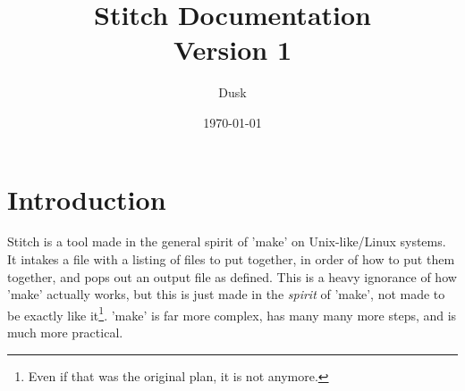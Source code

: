 \documentclass[12pt]{report}
\title{Stitch Documentation \\ \large Version 1}
\author{Dusk}
\date{\today}
\begin{document}
\maketitle

\section*{Introduction}
\hspace{12pt}
Stitch is a tool made in the general spirit of 'make' on Unix-like/Linux systems. It intakes a file with a listing of files to put together, in order of how to put them together, and pops out an output file as defined. This is a heavy ignorance of how 'make' actually works, but this is just made in the \textit{spirit} of 'make', not made to be exactly like it\footnote{Even if that was the original plan, it is not anymore.}. 'make' is far more complex, has many many more steps, and is much more practical.
\end{document}
